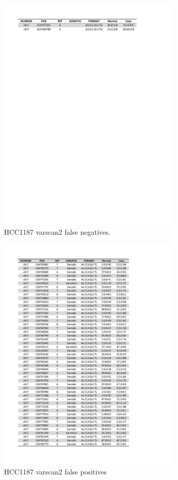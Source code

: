 \documentclass[11pt,reqno]{amsart}
\begin{document}
\begin{figure}[H]
\begin{center}
\includegraphics[width=0.8\textwidth]{pdf_figs/HCC1187_varscan2_false_negatives.pdf}
\caption{ HCC1187 varscan2 false negatives.}
\label{fig:rd_varscan2_FN}
\end{center}
\end{figure}

\begin{figure}[H]
\begin{center}
\includegraphics[width=0.8\textwidth]{pdf_figs/HCC1187_varscan2_false_positives.pdf}
\caption{HCC1187 varscan2 false positives}
\label{fig:rd_varscan2_FP}
\end{center}
\end{figure}




\end{document}
